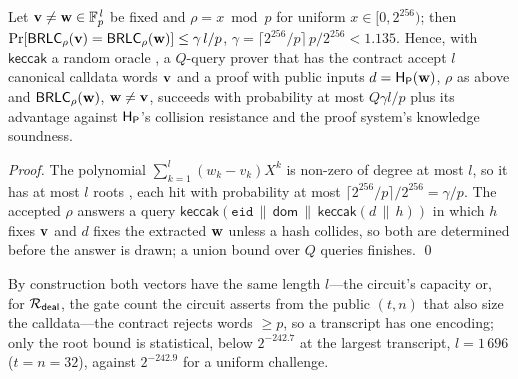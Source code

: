 \begin{lemma}
\label{lem:brlc}
Let $\mathbf{v} \ne \mathbf{w} \in \mathbb{F}_p^{\,l}$ be fixed and $\rho = x \bmod p$ for uniform $x \in [0, 2^{256})$; then $\Pr[\mathsf{BRLC}_\rho(\mathbf{v}) = \mathsf{BRLC}_\rho(\mathbf{w})] \le \gamma\,l/p$, $\gamma = \lceil 2^{256}/p\rceil\,p/2^{256} < 1.135$. Hence, with $\mathsf{keccak}$ a random oracle \cite{bellare1993random}, a $Q$-query prover that has the contract accept $l$ canonical calldata words $\mathbf{v}$ and a proof with public inputs $d = \mathsf{H}_{\mathsf{P}}(\mathbf{w})$, $\rho$ as above and $\mathsf{BRLC}_\rho(\mathbf{w})$, $\mathbf{w} \ne \mathbf{v}$, succeeds with probability at most $Q\gamma l/p$ plus its advantage against $\mathsf{H}_{\mathsf{P}}$'s collision resistance and the proof system's knowledge soundness.
\end{lemma}
\begin{proof}
The polynomial $\sum_{k=1}^{l}(w_k - v_k)X^k$ is non-zero of degree at most $l$, so it has at most $l$ roots \cite{schwartz1980fast}, each hit with probability at most $\lceil 2^{256}/p\rceil/2^{256} = \gamma/p$. The accepted $\rho$ answers a query $\mathsf{keccak}(\mathtt{eid}\,\|\,\mathsf{dom}\,\|\,\mathsf{keccak}(d\,\|\,h))$ in which $h$ fixes $\mathbf{v}$ and $d$ fixes the extracted $\mathbf{w}$ unless a hash collides, so both are determined before the answer is drawn; a union bound over $Q$ queries finishes. \qed
\end{proof}
\noindent By construction both vectors have the same length $l$---the circuit's capacity or, for $\mathcal{R}_{\mathsf{deal}}$, the gate count the circuit asserts from the public $(t, n)$ that also size the calldata---the contract rejects words $\ge p$, so a transcript has one encoding; only the root bound is statistical, below $2^{-242.7}$ at the largest transcript, $l = 1\,696$ ($t = n = 32$), against $2^{-242.9}$ for a uniform challenge.
